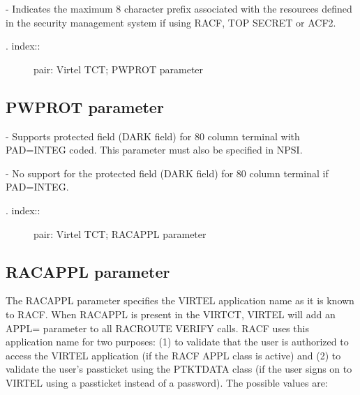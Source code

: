 \documentclass[letterpaper,10pt,english]{sphinxmanual}
\begin{document}
 - Indicates the maximum 8 character prefix associated with the resources defined in the security management system if using RACF, TOP SECRET or ACF2.
\begin{description}
\item[{. index::}] \leavevmode
pair: Virtel TCT; PWPROT parameter

\end{description}


\subsection{PWPROT parameter}
\label{\detokenize{Installation_Guide:pwprot-parameter}}
\begin{sphinxVerbatim}[commandchars=\\\{\}]
 
\end{sphinxVerbatim}

 - Supports protected field (DARK field) for 80 column terminal with PAD=INTEG coded. This parameter must also be specified in NPSI.

 - No support for the protected field (DARK field) for 80 column terminal if PAD=INTEG.
\begin{description}
\item[{. index::}] \leavevmode
pair: Virtel TCT; RACAPPL parameter

\end{description}


\subsection{RACAPPL parameter}
\label{\detokenize{Installation_Guide:racappl-parameter}}
\begin{sphinxVerbatim}[commandchars=\\\{\}]
 
\end{sphinxVerbatim}

The RACAPPL parameter specifies the VIRTEL application name as it is known to RACF. When RACAPPL is present in the VIRTCT, VIRTEL will add an APPL= parameter to all RACROUTE VERIFY calls. RACF uses this application name for two purposes: (1) to validate that the user is authorized to access the VIRTEL application (if the RACF APPL class is active) and (2) to validate the user’s passticket using the PTKTDATA class (if the user signs on to VIRTEL using a passticket instead of a password). The possible values are:
\end{document}
